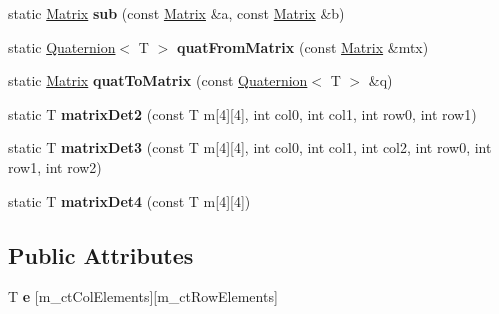 \begin{DoxyCompactItemize}
\item 
\hypertarget{classps_1_1base_1_1Matrix_aad420cc09eb4371557c4f335afd76f47}{}static \hyperlink{classps_1_1base_1_1Matrix}{Matrix} {\bfseries sub} (const \hyperlink{classps_1_1base_1_1Matrix}{Matrix} \&a, const \hyperlink{classps_1_1base_1_1Matrix}{Matrix} \&b)\label{classps_1_1base_1_1Matrix_aad420cc09eb4371557c4f335afd76f47}

\item 
\hypertarget{classps_1_1base_1_1Matrix_aad9aa2ef70dca8c96d4d890673eeb719}{}static \hyperlink{classps_1_1base_1_1Quaternion}{Quaternion}$<$ T $>$ {\bfseries quat\+From\+Matrix} (const \hyperlink{classps_1_1base_1_1Matrix}{Matrix} \&mtx)\label{classps_1_1base_1_1Matrix_aad9aa2ef70dca8c96d4d890673eeb719}

\item 
\hypertarget{classps_1_1base_1_1Matrix_acc8a3d63582b90ca5acbe0068b5b2edf}{}static \hyperlink{classps_1_1base_1_1Matrix}{Matrix} {\bfseries quat\+To\+Matrix} (const \hyperlink{classps_1_1base_1_1Quaternion}{Quaternion}$<$ T $>$ \&q)\label{classps_1_1base_1_1Matrix_acc8a3d63582b90ca5acbe0068b5b2edf}

\item 
\hypertarget{classps_1_1base_1_1Matrix_a710bf773209c487b4dfccaad8b80cf28}{}static T {\bfseries matrix\+Det2} (const T m\mbox{[}4\mbox{]}\mbox{[}4\mbox{]}, int col0, int col1, int row0, int row1)\label{classps_1_1base_1_1Matrix_a710bf773209c487b4dfccaad8b80cf28}

\item 
\hypertarget{classps_1_1base_1_1Matrix_aa46e61008959f6a26381581d2492578f}{}static T {\bfseries matrix\+Det3} (const T m\mbox{[}4\mbox{]}\mbox{[}4\mbox{]}, int col0, int col1, int col2, int row0, int row1, int row2)\label{classps_1_1base_1_1Matrix_aa46e61008959f6a26381581d2492578f}

\item 
\hypertarget{classps_1_1base_1_1Matrix_a0c86d500ca2ea40d981fde97321c6d0d}{}static T {\bfseries matrix\+Det4} (const T m\mbox{[}4\mbox{]}\mbox{[}4\mbox{]})\label{classps_1_1base_1_1Matrix_a0c86d500ca2ea40d981fde97321c6d0d}

\end{DoxyCompactItemize}
\subsection*{Public Attributes}
\begin{DoxyCompactItemize}
\item 
\hypertarget{classps_1_1base_1_1Matrix_aa535bf91d087c2e76de5382ae0beb997}{}T {\bfseries e} \mbox{[}m\+\_\+ct\+Col\+Elements\mbox{]}\mbox{[}m\+\_\+ct\+Row\+Elements\mbox{]}\label{classps_1_1base_1_1Matrix_aa535bf91d087c2e76de5382ae0beb997}

\end{DoxyCompactItemize}
